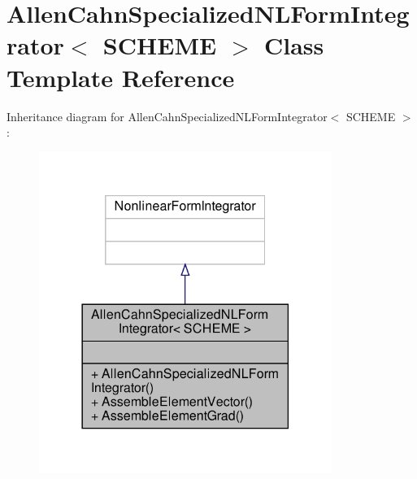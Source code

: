 \hypertarget{classAllenCahnSpecializedNLFormIntegrator}{}\section{Allen\+Cahn\+Specialized\+N\+L\+Form\+Integrator$<$ S\+C\+H\+E\+ME $>$ Class Template Reference}
\label{classAllenCahnSpecializedNLFormIntegrator}


Inheritance diagram for Allen\+Cahn\+Specialized\+N\+L\+Form\+Integrator$<$ S\+C\+H\+E\+ME $>$\+:\nopagebreak
\begin{figure}[H]
\begin{center}
\leavevmode
\includegraphics[width=270pt]{classAllenCahnSpecializedNLFormIntegrator__inherit__graph}
\end{center}
\end{figure}


